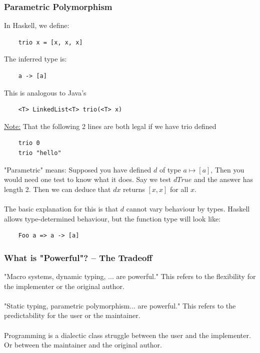 \documentclass[12pt]{article}
\begin{document}
\subsubsection{Parametric Polymorphism}

In Haskell, we define:

\begin{lstlisting}
    trio x = [x, x, x]
\end{lstlisting}
The inferred type is:
\begin{lstlisting}
    a -> [a]
\end{lstlisting}
This is analogous to Java's 
\begin{lstlisting}
    <T> LinkedList<T> trio(<T> x)
\end{lstlisting}

\underline{Note:} That the following 2 lines are both legal if we have trio defined
\begin{lstlisting}
    trio 0
    trio "hello"
\end{lstlisting}

"Parametric" means:
Supposed you have defined $d$ of type $a \mapsto [a]$, Then you would need one test to know what it does. Say we test $d True$ and the answer has length 2. Then we can deduce that $d x$ returns $[x,x]$ for all $x$.\\
\\
The basic explanation for this is that $d$ cannot vary behaviour by types. Haskell allows type-determined behaviour, but the function type will look like:
\begin{lstlisting}
    Foo a => a -> [a]
\end{lstlisting}

\subsubsection{What is "Powerful"? -- The Tradeoff}

"Macro systems, dynamic typing, ... are powerful." This refers to the flexibility for the implementer or the original author.\\
\\
"Static typing, parametric polymorphism... are powerful." This refers to the predictability for the user or the maintainer.\\
\\
Programming is a dialectic class struggle between the user and the implementer. Or between the maintainer and the original author.

\newpage
\end{document}
